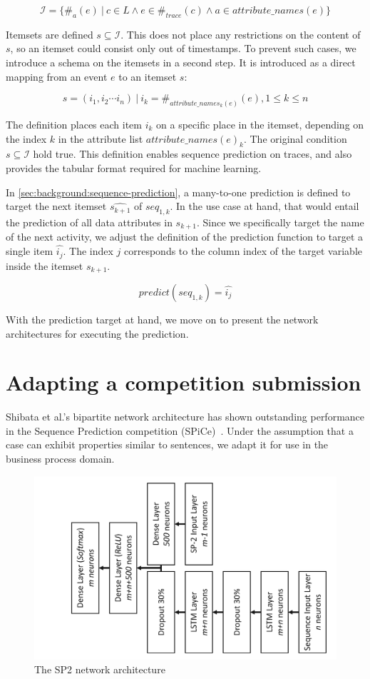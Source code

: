 $$\mathscr{I} = \{\#_{a}(e)\ |\ c \in L\wedge e \in \#_{trace}(c) \wedge a \in attribute\_names(e)\}$$

Itemsets are defined $s \subseteq \mathscr{I}$.
This does not place any restrictions on the content of $s$,
so an itemset could consist only out of timestamps.
To prevent such cases, we introduce a schema on the itemsets in a second step.
It is introduced as a direct mapping from an event $e$ to an itemset $s$:

$$ s = (i_1, i_2 \cdots i_n)\ |\ i_k = \#_{attribute\_names_k(e)}(e), 1 \leq k \leq n $$

The definition places each item $i_k$ on a specific place in the itemset, depending on the index $k$ in the attribute list $attribute\_names(e)_k$.
The original condition $s \subseteq \mathscr{I}$ hold true.
This definition enables sequence prediction on traces, and also provides the tabular format required for machine learning.

In \autoref{sec:background:sequence-prediction}, a many-to-one prediction is defined to target the next itemset $\widehat{s_{k+1}}$ of $seq_{1,k}$.
In the use case at hand, that would entail the prediction of all data attributes in $s_{k+1}$.
Since we specifically target the name of the next activity, we adjust the definition of the prediction function to target a single item $\hat{i_j}$. The index $j$ corresponds to the column index of the target variable inside the itemset $s_{k+1}$.

$$ predict(seq_{1,k}) = \hat{i_j} $$

With the prediction target at hand, we move on to present the network architectures for executing the prediction.

\section{Adapting a competition submission}\label{sec:contrib:sp2-inspiration}
Shibata et al.'s bipartite network architecture has shown outstanding performance in the Sequence Prediction competition (SPiCe)~\cite{web:spice}.
Under the assumption that a case can exhibit properties similar to sentences, we adapt it for use in the business process domain.

\begin{figure}[!htb]
    \centering
    \includegraphics[width=.8\textwidth, angle=-90,origin=c]{gfx/sp2-network-architecture.pdf}
    \caption{The SP2 network architecture}
    \label{fig:sp2-architecture}
\end{figure}

